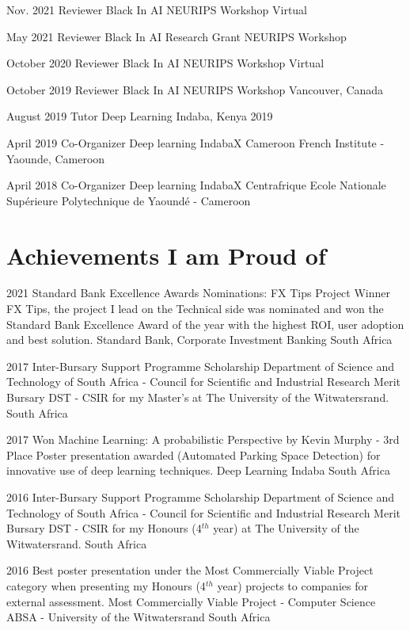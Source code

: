 \documentclass[11pt, letterpaper]{moderncv}        %
\begin{document}
\cventry
{Nov. 2021}
{Reviewer Black In AI}
{NEURIPS Workshop}
{Virtual}
{}
{}

\cventry
{May 2021}
{Reviewer Black In AI Research Grant}
{NEURIPS Workshop}
{}
{}
{}

\cventry
{October 2020}
{Reviewer Black In AI}
{NEURIPS Workshop}
{Virtual}
{}
{}

\cventry
{October 2019}
{Reviewer Black In AI}
{NEURIPS Workshop}
{Vancouver, Canada}
{}
{}

\cventry
{August 2019}
{Tutor}
{Deep Learning Indaba, Kenya 2019}
{}
{}
{}

\cventry
{April 2019}
{Co-Organizer Deep learning IndabaX Cameroon}
{French Institute - Yaounde, Cameroon}
{}
{}
{}


\cventry
{April 2018}
{Co-Organizer Deep learning IndabaX Centrafrique}
{Ecole Nationale Supérieure Polytechnique de Yaoundé - Cameroon}
{}
{}
{}


\section{Achievements I am Proud of}

\cventry
{2021}
{Standard Bank Excellence Awards Nominations: FX Tips Project Winner}
{FX Tips, the project I lead on the Technical side was nominated and won the Standard Bank Excellence Award of the year with the highest ROI, user adoption and best solution.}
{Standard Bank, Corporate Investment Banking}
{South Africa}
{}

\cventry
{2017}
{Inter-Bursary Support Programme Scholarship}
{Department of Science and Technology of South Africa - Council for Scientific and Industrial Research Merit Bursary}
{DST - CSIR for my Master's at The University of the Witwatersrand.}
{South Africa}
{}

\cventry
{2017}
{Won Machine Learning: A probabilistic Perspective by Kevin Murphy - 3rd Place}
{Poster presentation awarded (Automated Parking Space Detection) for innovative use of deep learning techniques.}
{Deep Learning Indaba}
{South Africa}
{}

\cventry
{2016}
{Inter-Bursary Support Programme Scholarship}
{Department of Science and Technology of South Africa - Council for Scientific and Industrial Research Merit Bursary}
{DST - CSIR for my Honours (4$^{th}$ year) at The University of the Witwatersrand.}
{South Africa}
{}


\cventry
{2016}
{Best poster presentation under the Most Commercially Viable Project category when presenting my Honours (4$^{th}$ year) projects to companies for external assessment.}
{Most Commercially Viable Project - Computer Science}
{ABSA - University of the Witwatersrand}
{South Africa}
{}
\end{document}
